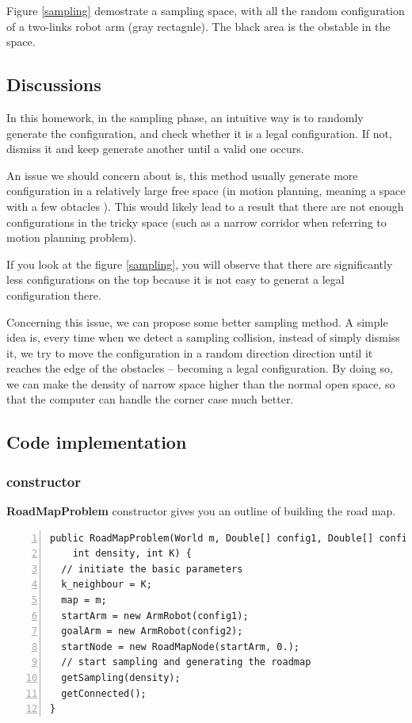 \documentclass{article}
\begin{document}
Figure \ref{sampling} demostrate a sampling space, with all the random configuration of a two-links robot arm (gray rectagnle). The black area is the obstable in the space. 

\subsection{Discussions}
In this homework, in the sampling phase, an intuitive way is to randomly generate the configuration, and check whether it is a legal configuration. If not, dismiss it and keep generate another until a valid one occurs. 

An issue we should concern about is, this method usually generate more configuration in a relatively large free space (in motion planning, meaning a space with a few obtacles ). This would likely lead to a result that there are not enough configurations in the tricky space (such as a narrow corridor when referring to motion planning problem).

If you look at the figure \ref{sampling}, you will observe that there are significantly less configurations on the top because it is not easy to generat a legal configuration there. 

Concerning this issue, we can propose some better sampling method.  A simple idea is, every time when we detect a sampling collision, instead of simply dismiss it, we try to move the configuration in a random direction direction until it reaches the edge of the obstacles -- becoming a legal configuration. By doing so, we can make the density of narrow space higher than the normal open space, so that the computer can handle the corner case much better.



\subsection{Code implementation}


\subsubsection{constructor}

\textbf{RoadMapProblem} constructor gives you an outline of building the road map.

\begin{lstlisting}[numbers=left]
public RoadMapProblem(World m, Double[] config1, Double[] config2,
    int density, int K) {
  // initiate the basic parameters 
  k_neighbour = K;
  map = m;
  startArm = new ArmRobot(config1);
  goalArm = new ArmRobot(config2);
  startNode = new RoadMapNode(startArm, 0.);
  // start sampling and generating the roadmap
  getSampling(density);
  getConnected();
}
\end{lstlisting}
\end{document}
